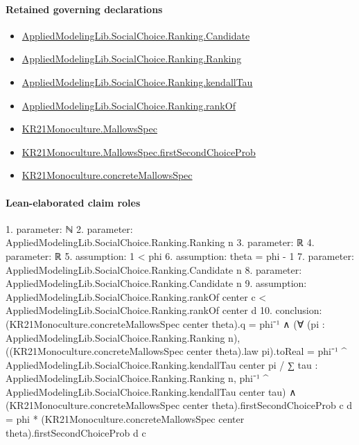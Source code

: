 \documentclass[10pt]{article}
\begin{document}
\paragraph{Retained governing declarations}
\begin{itemize}\raggedright
\item \hyperlink{library-prerequisite-8c0e6c25845ae78a}{Applied\allowbreak{}Modeling\allowbreak{}Lib.\allowbreak{}Social\allowbreak{}Choice.\allowbreak{}Ranking.\allowbreak{}Candidate}
\item \hyperlink{library-prerequisite-5cde54446d1ae021}{Applied\allowbreak{}Modeling\allowbreak{}Lib.\allowbreak{}Social\allowbreak{}Choice.\allowbreak{}Ranking.\allowbreak{}Ranking}
\item \hyperlink{governing-declaration-127efd44d176e2ba}{Applied\allowbreak{}Modeling\allowbreak{}Lib.\allowbreak{}Social\allowbreak{}Choice.\allowbreak{}Ranking.\allowbreak{}kendall\allowbreak{}Tau}
\item \hyperlink{governing-declaration-ef804e95c0f14f7c}{Applied\allowbreak{}Modeling\allowbreak{}Lib.\allowbreak{}Social\allowbreak{}Choice.\allowbreak{}Ranking.\allowbreak{}rank\allowbreak{}Of}
\item \hyperlink{governing-declaration-b2e6ec0602659b07}{KR21\allowbreak{}Monoculture.\allowbreak{}Mallows\allowbreak{}Spec}
\item \hyperlink{governing-declaration-5112f3183beb09fd}{KR21\allowbreak{}Monoculture.\allowbreak{}Mallows\allowbreak{}Spec.\allowbreak{}first\allowbreak{}Second\allowbreak{}Choice\allowbreak{}Prob}
\item \hyperlink{governing-declaration-0e399c7dd166853c}{KR21\allowbreak{}Monoculture.\allowbreak{}concrete\allowbreak{}Mallows\allowbreak{}Spec}
\end{itemize}
\paragraph{Lean-elaborated claim roles}\begin{ReviewVerbatim}
1. parameter: ℕ
2. parameter: AppliedModelingLib.SocialChoice.Ranking.Ranking n
3. parameter: ℝ
4. parameter: ℝ
5. assumption: 1 < phi
6. assumption: theta = phi - 1
7. parameter: AppliedModelingLib.SocialChoice.Ranking.Candidate n
8. parameter: AppliedModelingLib.SocialChoice.Ranking.Candidate n
9. assumption: AppliedModelingLib.SocialChoice.Ranking.rankOf center c < AppliedModelingLib.SocialChoice.Ranking.rankOf center d
10. conclusion: (KR21Monoculture.concreteMallowsSpec center theta).q = phi⁻¹ ∧
  (∀ (pi : AppliedModelingLib.SocialChoice.Ranking.Ranking n),
      ((KR21Monoculture.concreteMallowsSpec center theta).law pi).toReal =
        phi⁻¹ ^ AppliedModelingLib.SocialChoice.Ranking.kendallTau center pi /
          ∑ tau : AppliedModelingLib.SocialChoice.Ranking.Ranking n,
            phi⁻¹ ^ AppliedModelingLib.SocialChoice.Ranking.kendallTau center tau) ∧
    (KR21Monoculture.concreteMallowsSpec center theta).firstSecondChoiceProb c d =
      phi * (KR21Monoculture.concreteMallowsSpec center theta).firstSecondChoiceProb d c
\end{ReviewVerbatim}
\end{document}
